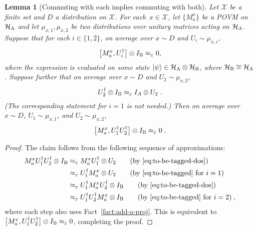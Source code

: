 \documentclass[11pt]{article}
\newtheorem{lemma}[theorem]{Lemma}
\theoremstyle{definition}
\newcommand{\ket}[1]{|#1\rangle}
\newcommand{\Id}{\ensuremath{I}}
\newcommand{\mH}{\ensuremath{\mathcal{H}}}
\newcommand{\eps}{\varepsilon}
\newcommand{\labelstyle}[1]{\ensuremath{\textsc{#1}}\xspace}
\newcommand{\alice}{\labelstyle{A}}
\newcommand{\bob}{\labelstyle{B}}
\renewcommand{\cal}[1]{\mathcal{#1}}
\begin{document}
\begin{lemma}[Commuting with each implies commuting with both]
  \label{lem:commute-with-both}
  Let $\cal{X}$ be a finite set and $D$ a distribution on $\cal{X}$.
  For each~$x\in \cal{X}$, let $\{ M^x_a \}$ be a POVM on $\mH_\alice$ and let
  $\mu_{x,1}, \mu_{x,2}$ be two distributions over unitary matrices acting on
  $\mH_\alice$.
  Suppose that for each $i \in \{1, 2\}$, on average over $x \sim D$ and $U_i
  \sim \mu_{x,i}$,
  \begin{equation}\label{eq:to-be-tagged}
    \bigl[ M^x_a , U_i^\dagger \bigr] \otimes \Id_\bob \approx_{\eps} 0,
  \end{equation}
  where the expression is evaluated on some state $\ket{\psi} \in
  \mH_\alice\otimes\mH_\bob$, where $\mH_\bob \cong \mH_\alice$.
  Suppose further that on average over $x \sim D$ and $U_2 \sim \mu_{x, 2}$,
  \begin{equation}\label{eq:to-be-tagged-dos}
    U_2^\dagger \otimes \Id_\bob \approx_{\eps} \Id_A \otimes U_2\;.
  \end{equation}
  (The corresponding statement for $i = 1$ is not needed.)
  Then on average over $x \sim D$, $U_1 \sim \mu_{x, 1}$, and $U_2 \sim \mu_{x,
    2}$,
  \begin{equation*}
    \bigl[ M^x_a , U_1^\dagger U_2^\dagger \bigr] \otimes \Id_\bob
    \approx_{\eps} 0\;.
  \end{equation*} 
\end{lemma}

\begin{proof}
  The claim follows from the following sequence of approximations:
  \begin{align*}
    M^x_a U_1^\dagger U_2^\dagger \otimes \Id_\bob
    & \approx_{\eps} M^x_a U_1^\dagger \otimes U_2
      \tag{by~\eqref{eq:to-be-tagged-dos}}\\
    & \approx_{\eps} U_1^\dagger M^x_a  \otimes U_2
      \tag{by~\eqref{eq:to-be-tagged} for $i = 1$}\\
    & \approx_{\eps} U_1^\dagger M^x_a U_2^\dagger \otimes \Id_\bob
      \tag{by~\eqref{eq:to-be-tagged-dos}}\\
    & \approx_{\eps} U_1^\dagger U_2^\dagger M^x_a \otimes \Id_\bob
      \tag{by~\eqref{eq:to-be-tagged} for $i = 2$}\;,
  \end{align*}
  where each step also uses Fact~\ref{fact:add-a-proj}.
  This is equivalent to $\bigl[ M^x_a , U_1^\dagger U_2^\dagger \bigr] \otimes
  \Id_\bob \approx_{\eps} 0$, completing the proof.
\end{proof}
\end{document}

